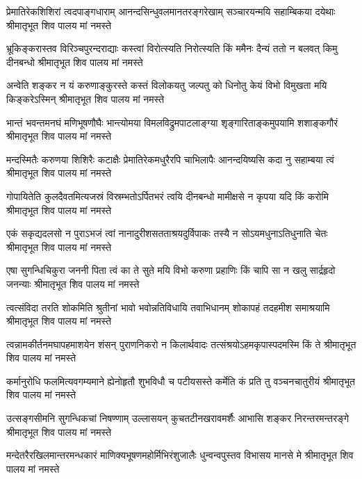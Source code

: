 \fourlineindentedshloka
{प्रेमातिरेकशिशिरां त्वदपाङ्गधाराम्}
{आनन्दसिन्धुवलमानतरङ्गरेखाम्}
{सञ्चारयन्मयि सहाम्बिकया दयेथाः}
{श्रीमातृभूत शिव पालय मां नमस्ते} %

\fourlineindentedshloka
{भ्रूकिङ्करास्तव विरिञ्चपुरन्दराद्याः}
{कस्त्वां विरोत्स्यति निरोत्स्यति किं ममैनः}
{दैन्यं ततो न बलवत् किमु दीनबन्धो}
{श्रीमातृभूत शिव पालय मां नमस्ते} %

\fourlineindentedshloka
{अन्वेति शङ्कर न यं करुणाङ्कुरस्ते}
{कस्तं विलोकयतु जल्पतु को धिनोतु}
{केयं विभो विमुखता मयि किङ्करेऽस्मिन्}
{श्रीमातृभूत शिव पालय मां नमस्ते}  %

\fourlineindentedshloka
{भान्तं भवन्तमनघं मणिभूषणौघैः}
{भान्त्योमया विमलविद्रुमपाटलाङ्ग्या}
{श‍ृङ्गारिताङ्कमुपयामि शशाङ्कगौरं}
{श्रीमातृभूत शिव पालय मां नमस्ते} %

\fourlineindentedshloka
{मन्दस्मितैः करुणया शिशिरैः कटाक्षैः}
{प्रेमातिरेकमधुरैरपि चाभिलापैः}
{आनन्दयिष्यसि कदा नु सहाम्बया त्वं}
{श्रीमातृभूत शिव पालय मां नमस्ते} %

\fourlineindentedshloka
{गोपायितेति कुलदैवतमित्यजस्रं}
{विस्रम्भतोऽर्पितभरं त्वयि दीनबन्धो}
{मामीक्षसे न कृपया यदि किं करोमि}
{श्रीमातृभूत शिव पालय मां नमस्ते} %

\fourlineindentedshloka
{एकं सकृद्यदलसो न पुराऽभजं त्वां}
{नानादुरीशसतताश्रयदुर्विपाकः}
{तस्यै न सोऽयमधुनाऽतिधुनाति चेतः}
{श्रीमातृभूत शिव पालय मां नमस्ते} %

\fourlineindentedshloka
{एषा सुगन्धिचिकुरा जननी पिता त्वं}
{का ते सुते मयि विभो करुणा प्रहाणिः}
{किं चापि सा न खलु सार्द्रहृदो जनन्याः}
{श्रीमातृभूत शिव पालय मां नमस्ते} %

\fourlineindentedshloka
{त्वत्संविदा तरति शोकमिति श्रुतीनां}
{भावो भवोन्नतिविधायि तवाभिधानम्}
{शोकापहं तदहमीश समाश्रयामि}
{श्रीमातृभूत शिव पालय मां नमस्ते} %

\fourlineindentedshloka
{त्वन्नामकीर्तनमघापहमाशयेन}
{शंसन् पुराणनिकरो न किलार्थवादः}
{तत्संश्रयोऽहमकृपास्पदमस्मि किं ते}
{श्रीमातृभूत शिव पालय मां नमस्ते} %

\fourlineindentedshloka
{कर्मानुरोधि फलमित्यवगम्यमाने}
{ह्येनोहृतौ शुभविधौ च पटीयसस्ते}
{कर्मेति कं प्रति तु वञ्चनचातुरीयं}
{श्रीमातृभूत शिव पालय मां नमस्ते} %

\fourlineindentedshloka
{उत्सङ्गसीमनि सुगन्धिकचां निषण्णाम्}
{उल्लासयन् कुचतटीनखरावमर्शैः}
{आभासि शङ्कर निरन्तरमन्तरङ्गे}
{श्रीमातृभूत शिव पालय मां नमस्ते} %

\fourlineindentedshloka
{मन्देतरैरखिलमान्तरमन्धकारं}
{माणिक्यभूषणमहोर्मिभिरंशुजालैः}
{धुन्वन्वपुस्तव विभासय मानसे मे}
{श्रीमातृभूत शिव पालय मां नमस्ते} %

